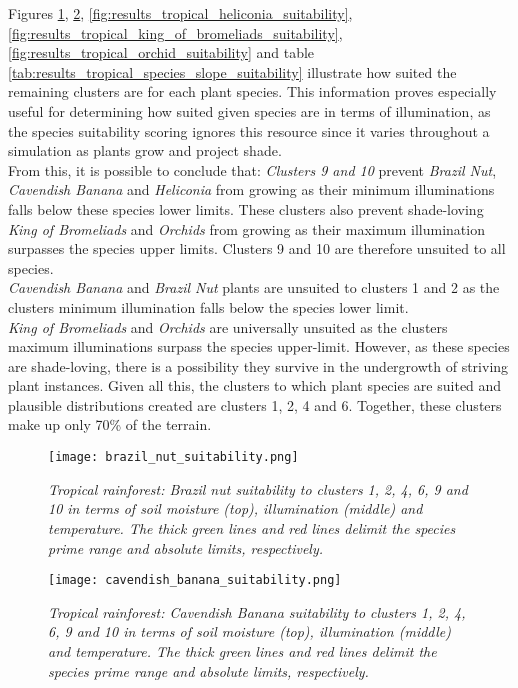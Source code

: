 Figures \ref{fig:results_tropical_brazil_nut_suitability}, \ref{fig:results_tropical_cavendish_banana_suitability}, \ref{fig:results_tropical_heliconia_suitability}, \ref{fig:results_tropical_king_of_bromeliads_suitability}, \ref{fig:results_tropical_orchid_suitability} and table \ref{tab:results_tropical_species_slope_suitability} illustrate how suited the remaining clusters are for each plant species. This information proves especially useful for determining how suited given species are in terms of illumination, as the species suitability scoring ignores this resource since it varies throughout a simulation as plants grow and project shade.\\
From this, it is possible to conclude that: \textit{Clusters 9 and 10} prevent \textit{Brazil Nut}, \textit{Cavendish Banana} and \textit{Heliconia} from growing as their minimum illuminations falls below these species lower limits. These clusters also prevent shade-loving \textit{King of Bromeliads} and \textit{Orchids} from growing as their maximum illumination surpasses the species upper limits. Clusters 9 and 10 are therefore unsuited to all species.\\
\textit{Cavendish Banana} and \textit{Brazil Nut} plants are unsuited to clusters 1 and 2 as the clusters minimum illumination falls below the species lower limit.\\
\textit{King of Bromeliads} and \textit{Orchids} are universally unsuited as the clusters maximum illuminations surpass the species upper-limit. However, as these species are shade-loving, there is a possibility they survive in the undergrowth of striving plant instances. Given all this, the clusters to which plant species are suited and plausible distributions created are clusters 1, 2, 4 and 6. Together, these clusters make up only 70\% of the terrain.\\

\begin{figure}[htb!]
\center
	\texttt{[image: brazil\_nut\_suitability.png]}
	\caption{ \textit{Tropical rainforest: Brazil nut suitability to clusters 1, 2, 4, 6, 9 and 10 in terms of soil moisture (top), illumination (middle) and temperature. The thick green lines and red lines delimit the species prime range and absolute limits, respectively.} }
	\label{fig:results_tropical_brazil_nut_suitability}
\end{figure}

\begin{figure}[htb!]
\center
	\texttt{[image: cavendish\_banana\_suitability.png]}
	\caption{ \textit{Tropical rainforest: Cavendish Banana suitability to clusters 1, 2, 4, 6, 9 and 10 in terms of soil moisture (top), illumination (middle) and temperature. The thick green lines and red lines delimit the species prime range and absolute limits, respectively.}}
	\label{fig:results_tropical_cavendish_banana_suitability}
\end{figure}

